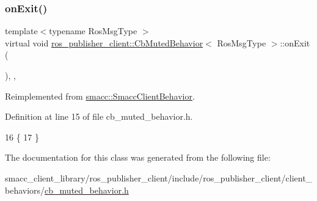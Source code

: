 \subsubsection{\texorpdfstring{on\+Exit()}{onExit()}}
{\footnotesize\ttfamily template$<$typename Ros\+Msg\+Type $>$ \\
virtual void \hyperlink{classros__publisher__client_1_1CbMutedBehavior}{ros\+\_\+publisher\+\_\+client\+::\+Cb\+Muted\+Behavior}$<$ Ros\+Msg\+Type $>$\+::on\+Exit (\begin{DoxyParamCaption}{ }\end{DoxyParamCaption})\hspace{0.3cm}{\ttfamily [inline]}, {\ttfamily [override]}, {\ttfamily [virtual]}}



Reimplemented from \hyperlink{classsmacc_1_1SmaccClientBehavior_ac0cd72d42bd00425362a97c9803ecce5}{smacc\+::\+Smacc\+Client\+Behavior}.



Definition at line 15 of file cb\+\_\+muted\+\_\+behavior.\+h.


\begin{DoxyCode}
16     \{
17     \}
\end{DoxyCode}


The documentation for this class was generated from the following file\+:\begin{DoxyCompactItemize}
\item 
smacc\+\_\+client\+\_\+library/ros\+\_\+publisher\+\_\+client/include/ros\+\_\+publisher\+\_\+client/client\+\_\+behaviors/\hyperlink{cb__muted__behavior_8h}{cb\+\_\+muted\+\_\+behavior.\+h}\end{DoxyCompactItemize}
